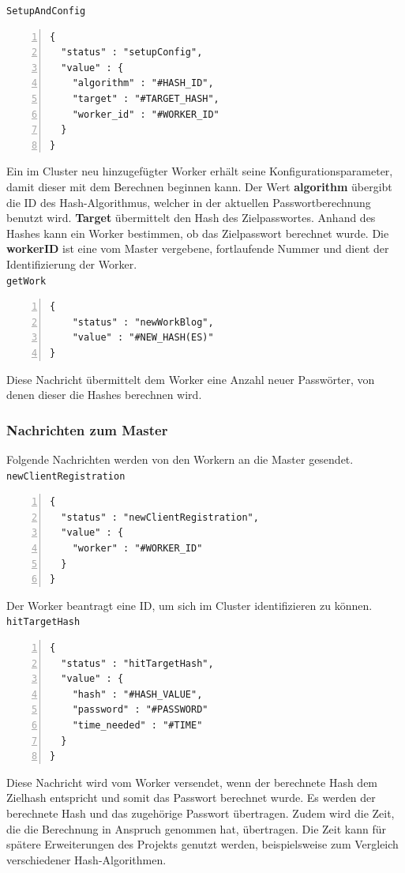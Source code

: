 \texttt{SetupAndConfig}
\begin{lstlisting}[basicstyle=\ttfamily,numbers=left,numberstyle=\footnotesize\ttfamily,backgroundcolor=\color{sourcegray}]
{
  "status" : "setupConfig",
  "value" : {
    "algorithm" : "#HASH_ID",
    "target" : "#TARGET_HASH", 
    "worker_id" : "#WORKER_ID"
  }
}
\end{lstlisting}
Ein im Cluster neu hinzugefügter Worker erhält seine Konfigurationsparameter, damit dieser mit dem Berechnen beginnen kann. 
Der Wert \textbf{algorithm} übergibt die ID des Hash-Algorithmus, welcher in der aktuellen Passwortberechnung benutzt wird. \textbf{Target} übermittelt den Hash des Zielpasswortes. Anhand des Hashes kann ein Worker bestimmen, ob das Zielpasswort berechnet wurde. Die \textbf{workerID} ist eine vom Master vergebene, fortlaufende Nummer und dient der Identifizierung der Worker.\\

\texttt{getWork}
\begin{lstlisting}[basicstyle=\ttfamily,numbers=left,numberstyle=\footnotesize\ttfamily,backgroundcolor=\color{sourcegray}]
{
	"status" : "newWorkBlog",
  	"value" : "#NEW_HASH(ES)"
}
\end{lstlisting}
Diese Nachricht übermittelt dem Worker eine Anzahl neuer Passwörter, von denen dieser die Hashes berechnen wird.


\subsubsection{Nachrichten zum Master}
Folgende Nachrichten werden von den Workern an die Master gesendet. \\

\texttt{newClientRegistration}
\begin{lstlisting}[basicstyle=\ttfamily,numbers=left,numberstyle=\footnotesize\ttfamily,backgroundcolor=\color{sourcegray}]
{
  "status" : "newClientRegistration",
  "value" : {
    "worker" : "#WORKER_ID"
  }
}
\end{lstlisting}
Der Worker beantragt eine ID, um sich im Cluster identifizieren zu können.\\

\texttt{hitTargetHash}
\begin{lstlisting}[basicstyle=\ttfamily,numbers=left,numberstyle=\footnotesize\ttfamily,backgroundcolor=\color{sourcegray}]
{
  "status" : "hitTargetHash",
  "value" : {
    "hash" : "#HASH_VALUE",
    "password" : "#PASSWORD"
    "time_needed" : "#TIME"
  }
}\end{lstlisting}
Diese Nachricht wird vom Worker versendet, wenn der berechnete Hash dem Zielhash entspricht und somit das Passwort berechnet wurde. Es werden der berechnete Hash und das zugehörige Passwort übertragen. Zudem wird die Zeit, die die Berechnung in Anspruch genommen hat, übertragen. Die Zeit kann für spätere Erweiterungen des Projekts genutzt werden, beispielsweise zum Vergleich verschiedener Hash-Algorithmen.\\


